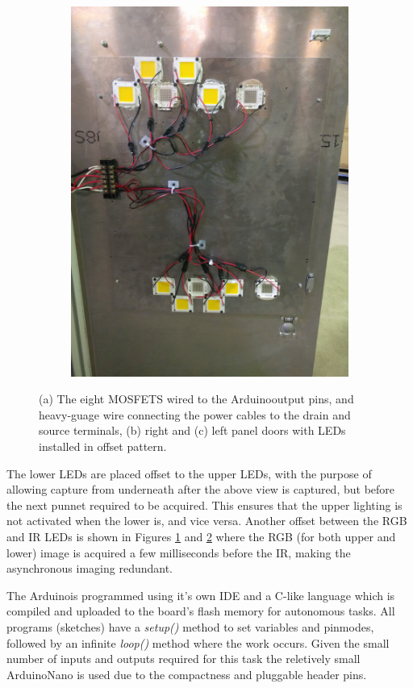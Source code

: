 \documentclass[fleqn,twoside]{article}
\begin{document}
\begin{figure}[h]
\begin{subfigure}{0.25\textwidth}
		\label{fig:LED_door_1}
	\end{subfigure}%
	\begin{subfigure}{0.25\textwidth}
		\centering
		\includegraphics[width=0.8\linewidth]{LED_door_2.jpg}
		\caption{}
		\label{fig:LED_door_2}
	\end{subfigure}%
	\caption{(a) The eight MOSFETS wired to the Arduino\texttrademark output pins, and heavy-guage wire connecting the power cables to the drain and source terminals, (b) right and (c) left panel doors with LEDs installed in offset pattern.}
	\label{}
\end{figure}

The lower LEDs are placed offset to the upper LEDs, with the purpose of allowing capture from underneath after the above view is captured, but before the next punnet required to be acquired. This ensures that the upper lighting is not activated when the lower is, and vice versa. Another offset between the RGB and IR LEDs is shown in Figures \ref{fig:LED_door_1} and \ref{fig:LED_door_2} where the RGB (for both upper and lower) image is acquired a few milliseconds before the IR, making the asynchronous imaging redundant.

The Arduino\texttrademark is programmed using it's own IDE and a C-like language which is compiled and uploaded to the board's flash memory for autonomous tasks. All programs (sketches) have a \textit{setup()} method to set variables and pinmodes, followed by an infinite \textit{loop()} method where the work occurs. Given the small number of inputs and outputs required for this task the reletively small Arduino\texttrademark Nano is used due to the compactness and pluggable header pins.
\end{document}
